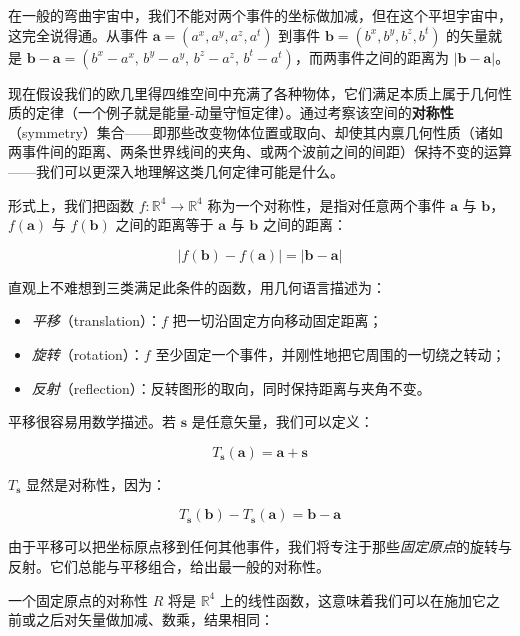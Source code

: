 在一般的弯曲宇宙中，我们不能对两个事件的坐标做加减，但在这个平坦宇宙中，这完全说得通。从事件 $\mathbf{a}=(a^{x},a^{y},a^{z},a^{t})$ 到事件 $\mathbf{b}=(b^{x},b^{y},b^{z},b^{t})$ 的矢量就是 $\mathbf{b}-\mathbf{a}=(b^{x}-a^{x},\,b^{y}-a^{y},\,b^{z}-a^{z},\,b^{t}-a^{t})$，而两事件之间的距离为 $|\mathbf{b}-\mathbf{a}|$。

现在假设我们的欧几里得四维空间中充满了各种物体，它们满足本质上属于几何性质的定律（一个例子就是能量-动量守恒定律）。通过考察该空间的\textbf{对称性}（symmetry）集合——即那些改变物体位置或取向、却使其内禀几何性质（诸如两事件间的距离、两条世界线间的夹角、或两个波前之间的间距）保持不变的运算——我们可以更深入地理解这类几何定律可能是什么。

形式上，我们把函数 $f:\mathbb{R}^{4}\to\mathbb{R}^{4}$ 称为一个对称性，是指对任意两个事件 $\mathbf{a}$ 与 $\mathbf{b}$，$f(\mathbf{a})$ 与 $f(\mathbf{b})$ 之间的距离等于 $\mathbf{a}$ 与 $\mathbf{b}$ 之间的距离：

\begin{equation}
|f(\mathbf{b})-f(\mathbf{a})| = |\mathbf{b}-\mathbf{a}|
\end{equation}

直观上不难想到三类满足此条件的函数，用几何语言描述为：

\begin{itemize}
  \item \emph{平移}（translation）：$f$ 把一切沿固定方向移动固定距离；
  \item \emph{旋转}（rotation）：$f$ 至少固定一个事件，并刚性地把它周围的一切绕之转动；
  \item \emph{反射}（reflection）：反转图形的取向，同时保持距离与夹角不变。
\end{itemize}

平移很容易用数学描述。若 $\mathbf{s}$ 是任意矢量，我们可以定义：

\begin{equation}
T_{\mathbf{s}}(\mathbf{a}) = \mathbf{a} + \mathbf{s}
\end{equation}

$T_{\mathbf{s}}$ 显然是对称性，因为：

\begin{equation}
T_{\mathbf{s}}(\mathbf{b}) - T_{\mathbf{s}}(\mathbf{a}) = \mathbf{b}-\mathbf{a}
\end{equation}

由于平移可以把坐标原点移到任何其他事件，我们将专注于那些\emph{固定原点}的旋转与反射。它们总能与平移组合，给出最一般的对称性。

一个固定原点的对称性 $R$ 将是 $\mathbb{R}^{4}$ 上的线性函数，这意味着我们可以在施加它之前或之后对矢量做加减、数乘，结果相同：

